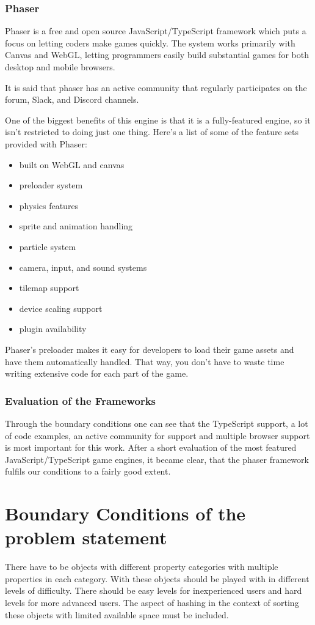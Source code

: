 \subsubsection{Phaser}
Phaser is a free and open source JavaScript/TypeScript framework which puts a focus on letting coders make games quickly.
The system works primarily with Canvas and WebGL, letting programmers easily build substantial games for both
desktop and mobile browsers.

It is said that phaser has an active community that regularly participates on the forum, Slack, and Discord channels.

One of the biggest benefits of this engine is that it is a fully-featured engine,
so it isn’t restricted to doing just one thing.
Here’s a list of some of the feature sets provided with Phaser:

\begin{itemize}
    \item built on WebGL and canvas
    \item preloader system
    \item physics features
    \item sprite and animation handling
    \item particle system
    \item camera, input, and sound systems
    \item tilemap support
    \item device scaling support
    \item plugin availability
\end{itemize}

Phaser’s preloader makes it easy for developers to load their game assets and have them automatically handled.
That way, you don’t have to waste time writing extensive code for each part of the game\cite{phaserad}.

\subsubsection{Evaluation of the Frameworks}
Through the boundary conditions one can see that the TypeScript support, a lot of code examples,
an active community for support and multiple browser support is most important for this work.
After a short evaluation of the most featured JavaScript/TypeScript game engines, it became clear,
that the phaser framework fulfils our conditions to a fairly good extent.

\section{Boundary Conditions of the problem statement}
There have to be objects with different property categories with multiple properties in each category.
With these objects should be played with in different levels of difficulty.
There should be easy levels for inexperienced users and hard levels for more advanced users.
The aspect of hashing in the context of sorting these objects with limited available space must be included.

